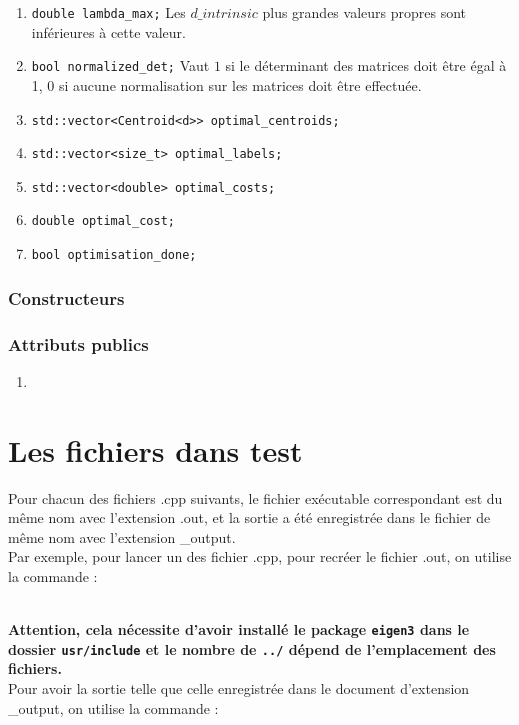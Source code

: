 \documentclass[10pt,a4paper,notitlepage]{article}
\begin{document}
\begin{enumerate}
\item \texttt{double lambda\_max;} Les $d\_intrinsic$ plus grandes valeurs propres sont inférieures à cette valeur.
\item \texttt{bool normalized\_det;} Vaut $1$ si le déterminant des matrices doit être égal à 1, 0 si aucune normalisation sur les matrices doit être effectuée.
\item \texttt{std::vector<Centroid<d>> optimal\_centroids;} 
\item \texttt{std::vector<size\_t> optimal\_labels;}
\item \texttt{std::vector<double> optimal\_costs;}
\item \texttt{double optimal\_cost;}
\item \texttt{bool optimisation\_done;}
\end{enumerate}
\subsubsection{Constructeurs}
\subsubsection{Attributs publics}
\begin{enumerate}
\item
\end{enumerate}

\section{Les fichiers dans test}

Pour chacun des fichiers .cpp suivants, le fichier exécutable correspondant est du même nom avec l'extension .out, et la sortie a été enregistrée dans le fichier de même nom avec l'extension \_output.\\

Par exemple, pour lancer un des fichier .cpp, pour recréer le fichier .out, on utilise la commande :

\\

\textbf{Attention, cela nécessite d'avoir installé le package \texttt{eigen3} dans le dossier \texttt{usr/include} et le nombre de \texttt{../} dépend de l'emplacement des fichiers.}\\

Pour avoir la sortie telle que celle enregistrée dans le document d'extension \_output, on utilise la commande :
\end{document}
